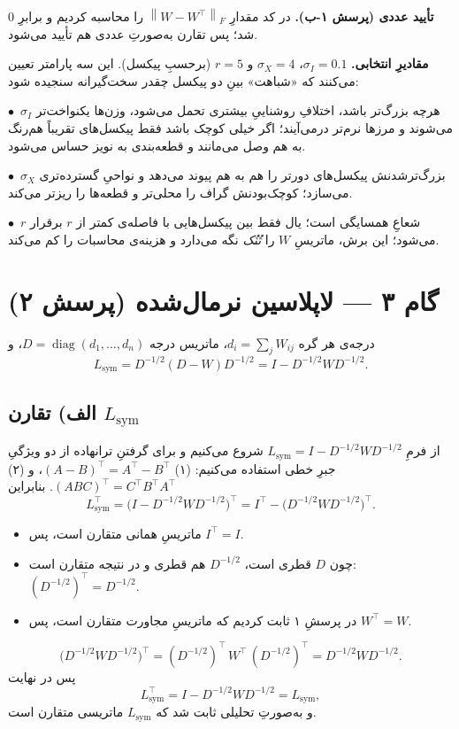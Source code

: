 \documentclass[14pt]{extarticle}
\newcommand{\norm}[1]{\left\lVert #1 \right\rVert}
\newcommand{\T}{^{\top}}
\begin{document}
\noindent\textbf{تأیید عددی (پرسش ۱-ب).}
در کد مقدارِ $\norm{W-W\T}_F$ را محاسبه کردیم و برابرِ $0$ شد؛ پس تقارن به‌صورتِ عددی هم تأیید می‌شود.

\medskip
\noindent\textbf{مقادیرِ انتخابی.} $\sigma_I=0.1$، $\sigma_X=4$ و $r=5$ (برحسبِ پیکسل). این سه پارامتر تعیین می‌کنند که «شباهت» بینِ دو پیکسل چقدر سخت‌گیرانه سنجیده شود:

\smallskip
\noindent$\bullet$~\textbf{$\sigma_I$} هرچه بزرگ‌تر باشد، اختلافِ روشناییِ بیشتری تحمل می‌شود، وزن‌ها یکنواخت‌تر می‌شوند و مرزها نرم‌تر درمی‌آیند؛ اگر خیلی کوچک باشد فقط پیکسل‌های تقریباً هم‌رنگ به هم وصل می‌مانند و قطعه‌بندی به نویز حساس می‌شود.

\smallskip
\noindent$\bullet$~\textbf{$\sigma_X$} بزرگ‌ترشدنش پیکسل‌های دورتر را هم به هم پیوند می‌دهد و نواحیِ گسترده‌تری می‌سازد؛ کوچک‌بودنش گراف را محلی‌تر و قطعه‌ها را ریزتر می‌کند.

\smallskip
\noindent$\bullet$~\textbf{$r$} شعاعِ همسایگی است؛ یال فقط بین پیکسل‌هایی با فاصله‌ی کمتر از $r$ برقرار می‌شود؛ این برش، ماتریسِ $W$ را \emph{تُنُک} نگه می‌دارد و هزینه‌ی محاسبات را کم می‌کند.

\newpage
\section{گام ۳ --- لاپلاسین نرمال‌شده (پرسش ۲)}

درجه‌ی هر گره $d_i=\sum_j W_{ij}$، ماتریس درجه $D=\operatorname{diag}(d_1,\dots,d_n)$، و
\[
L_{\mathrm{sym}}=D^{-1/2}(D-W)D^{-1/2}=I-D^{-1/2}W D^{-1/2}.
\]

\subsection{الف) تقارن \texorpdfstring{$L_{\mathrm{sym}}$}{Lsym}}

\begin{proofx}
از فرمِ $L_{\mathrm{sym}}=I-D^{-1/2}W D^{-1/2}$ شروع می‌کنیم و برای گرفتنِ ترانهاده از دو ویژگیِ جبرِ خطی استفاده می‌کنیم: (۱) $(A-B)\T=A\T-B\T$، و (۲) $(ABC)\T=C\T B\T A\T$. بنابراین
\[
L_{\mathrm{sym}}\T=\bigl(I-D^{-1/2}W D^{-1/2}\bigr)\T
= I\T-\bigl(D^{-1/2}W D^{-1/2}\bigr)\T .
\]
\begin{itemize}[leftmargin=1.6em,itemsep=1pt,topsep=2pt]
\item ماتریسِ همانی متقارن است، پس $I\T=I$.
\item چون $D$ قطری است، $D^{-1/2}$ هم قطری و در نتیجه متقارن است: $(D^{-1/2})\T=D^{-1/2}$.
\item در پرسشِ ۱ ثابت کردیم که ماتریسِ مجاورت متقارن است، پس $W\T=W$.
\end{itemize}
\[
\bigl(D^{-1/2}W D^{-1/2}\bigr)\T=(D^{-1/2})\T\,W\T\,(D^{-1/2})\T
= D^{-1/2}W D^{-1/2}.
\]
پس در نهایت
\[
L_{\mathrm{sym}}\T = I-D^{-1/2}W D^{-1/2}=L_{\mathrm{sym}} ,
\]
و به‌صورتِ تحلیلی ثابت شد که $L_{\mathrm{sym}}$ ماتریسی متقارن است.
\end{proofx}
\end{document}
